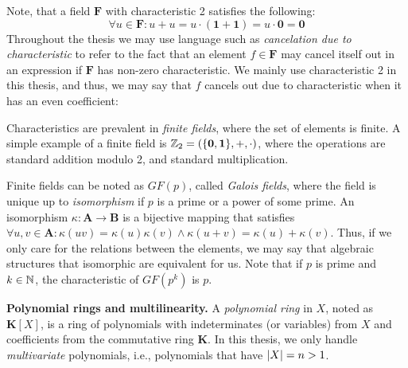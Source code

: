 Note, that a field $\mathbf{F}$ with 
characteristic 2 satisfies the following:
\[
  \forall u \in \mathbf{F} \colon u + u = u \cdot (\mathbf 1 + \mathbf 1) = u \cdot \mathbf 0 = \mathbf 0
\]
Throughout the thesis we may use language such as \emph{cancelation due to characteristic} to 
refer to the fact that an element $f \in \mathbf{F}$ may cancel itself out in an expression if 
$\mathbf{F}$ has non-zero characteristic. 
We mainly use characteristic 2 in this thesis, and thus, we may say that 
$f$ cancels out due to characteristic when 
it has an even coefficient: 

Characteristics are prevalent in \emph{finite fields}, where the set of elements is finite. 
A simple example of a finite field is $\mathbb Z_2 = (\{\mathbf{0}, \mathbf{1}\}, +, \cdot)$, where 
the operations are standard addition modulo 2, and standard multiplication. 

Finite fields can be noted as $GF(p)$, called \emph{Galois fields}, where the field is unique 
up to \emph{isomorphism} if $p$ is a prime or a power of some prime. 
An isomorphism $\kappa \colon \mathbf{A} \to \mathbf{B}$ 
is a bijective mapping that satisfies 
$\forall u,v \in \mathbf{A} \colon \kappa(uv) = \kappa(u)\kappa(v) \wedge \kappa(u+v) = \kappa(u)+\kappa(v).$ 
Thus, if we only care for the relations between the elements, 
we may say that algebraic structures that isomorphic are 
equivalent for us. 
Note that if $p$ is prime and $k \in \mathbb N$, the characteristic of $GF(p^k)$ is $p$. 

\textbf{Polynomial rings and multilinearity.} 
A \emph{polynomial ring} in $X$, noted as $\mathbf{K}[X]$,
is a ring of polynomials with indeterminates (or variables) from $X$ and 
coefficients from the commutative ring $\mathbf{K}$. 
In this thesis, we only handle \emph{multivariate} 
polynomials, i.e., polynomials that have ${\left\vert X\right\vert} = n > 1$. 

